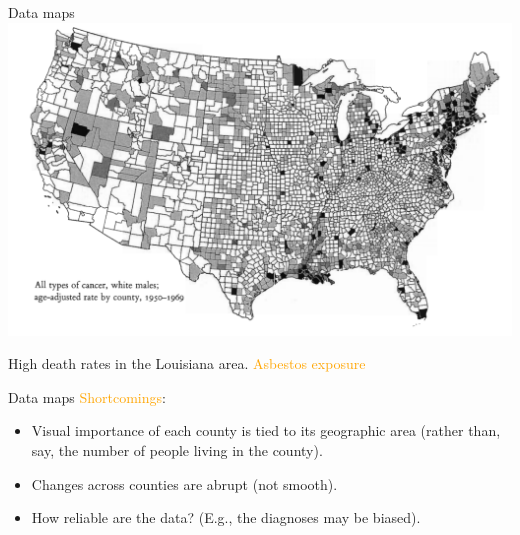 \documentclass[
  ignorenonframetext,
]{beamer}
\begin{document}
\begin{frame}{Data maps}
\protect\hypertarget{data-maps-3}{}
\includegraphics{excellence_figs/fig_10.png}

High death rates in the Louisiana area.
\textcolor{orange}{Asbestos exposure}
\end{frame}

\begin{frame}{Data maps}
\protect\hypertarget{data-maps-4}{}
\textcolor{orange}{Shortcomings}:

\begin{itemize}
\item
  Visual importance of each county is tied to its geographic area
  (rather than, say, the number of people living in the county).
\item
  Changes across counties are abrupt (not smooth).
\item
  How reliable are the data? (E.g., the diagnoses may be biased).
\end{itemize}
\end{frame}
\end{document}
